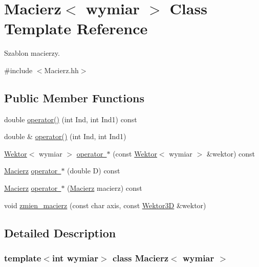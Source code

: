 \hypertarget{class_macierz}{}\section{Macierz$<$ wymiar $>$ Class Template Reference}
\label{class_macierz}


Szablon macierzy.  




{\ttfamily \#include $<$Macierz.\+hh$>$}

\subsection*{Public Member Functions}
\begin{DoxyCompactItemize}
\item 
double \mbox{\hyperlink{class_macierz_a536c8c19130df4b64467de2745bcdd4b}{operator()}} (int Ind, int Ind1) const
\item 
double \& \mbox{\hyperlink{class_macierz_a62fdb2bc9eeb1a119a89348e8954ca5e}{operator()}} (int Ind, int Ind1)
\item 
\mbox{\hyperlink{class_wektor}{Wektor}}$<$ wymiar $>$ \mbox{\hyperlink{class_macierz_a58be78b866f3a120b5c5bb654c8043b2}{operator $\ast$}} (const \mbox{\hyperlink{class_wektor}{Wektor}}$<$ wymiar $>$ \&wektor) const
\item 
\mbox{\hyperlink{class_macierz}{Macierz}} \mbox{\hyperlink{class_macierz_a68e53f895c6949465d318aef03b11803}{operator $\ast$}} (double D) const
\item 
\mbox{\hyperlink{class_macierz}{Macierz}} \mbox{\hyperlink{class_macierz_af7de2a2c8d9fd868fa41a530112baa4e}{operator $\ast$}} (\mbox{\hyperlink{class_macierz}{Macierz}} macierz) const
\item 
void \mbox{\hyperlink{class_macierz_ad07d660e3cb6f1fef0eed03ddc73123b}{zmien\+\_\+macierz}} (const char axis, const \mbox{\hyperlink{class_wektor}{Wektor3D}} \&wektor)
\end{DoxyCompactItemize}


\subsection{Detailed Description}
\subsubsection*{template$<$int wymiar$>$\newline
class Macierz$<$ wymiar $>$}


